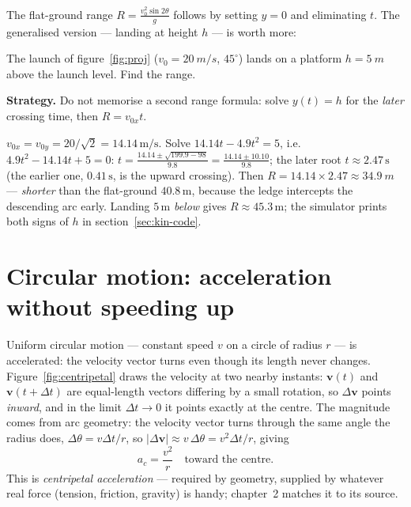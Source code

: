 The flat-ground range $R=\frac{v_0^{2}\sin2\theta}{g}$ follows by setting
$y=0$ and eliminating $t$. The generalised version --- landing at height $h$
--- is worth more:

\begin{example}\label{ex:elevated}
The launch of figure~\ref{fig:proj} ($v_0=\qty{20}{m/s}$, $45^{\circ}$)
lands on a platform $h=\qty{5}{m}$ above the launch level. Find the range.
\par\smallskip
\textbf{Strategy.} Do not memorise a second range formula: solve
$y(t)=h$ for the \emph{later} crossing time, then $R=v_{0x}t$.
\begin{solution}
$v_{0x}=v_{0y}=20/\sqrt2=14.14\,\mathrm{m/s}$. Solve
$14.14t-4.9t^{2}=5$, i.e.\ $4.9t^{2}-14.14t+5=0$:
$t=\frac{14.14\pm\sqrt{199.9-98}}{9.8}=\frac{14.14\pm10.10}{9.8}$; the
later root $t\approx2.47\,\mathrm{s}$ (the earlier one,
$0.41\,\mathrm{s}$, is the upward crossing). Then
$R=14.14\times2.47\approx\qty{34.9}{m}$ --- \emph{shorter} than the
flat-ground $40.8\,\mathrm{m}$, because the ledge intercepts the
descending arc early. Landing $5\,\mathrm{m}$ \emph{below} gives
$R\approx45.3\,\mathrm{m}$; the simulator prints both signs of $h$ in
section~\ref{sec:kin-code}. \checkmark
\end{solution}
\end{example}

\section{Circular motion: acceleration without speeding up}\label{sec:kin-circ}

Uniform circular motion --- constant speed $v$ on a circle of radius $r$ ---
is accelerated: the velocity vector turns even though its length never
changes. Figure~\ref{fig:centripetal} draws the velocity at two nearby
instants: $\mathbf v(t)$ and $\mathbf v(t+\Delta t)$ are equal-length vectors
differing by a small rotation, so $\Delta\mathbf v$ points \emph{inward}, and
in the limit $\Delta t\to0$ it points exactly at the centre. The magnitude
comes from arc geometry: the velocity vector turns through the same angle the
radius does, $\Delta\theta=v\Delta t/r$, so
$|\Delta\mathbf v|\approx v\,\Delta\theta=v^{2}\Delta t/r$, giving
\begin{equation}
  a_c=\frac{v^{2}}{r}\quad\text{toward the centre.}\label{eq:ac}
\end{equation}
This is \emph{centripetal acceleration} ---
required by geometry, supplied by whatever real force (tension, friction,
gravity) is handy; chapter~2 matches it to its source.

